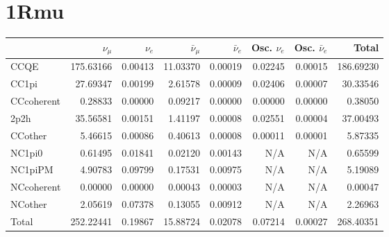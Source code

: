\documentclass[10pt,a4paper]{article}
\begin{document}
\section*{1Rmu}
\begin{tabular} { | l ||r | r | r | r | r | r | | r | }
\hline
              & $\nu_\mu$            & $\nu_e$              & $\bar{\nu}_{\mu}$    & $\bar{\nu}_{e}$      & Osc. $\nu_e$         & Osc. $\bar{\nu}_{e}$ & Total                \\ \hline\hline
 CCQE         & 175.63166            & 0.00413              & 11.03370             & 0.00019              & 0.02245              & 0.00015              & 186.69230            \\ \hline
 CC1pi        & 27.69347             & 0.00199              & 2.61578              & 0.00009              & 0.02406              & 0.00007              & 30.33546             \\ \hline
 CCcoherent   & 0.28833              & 0.00000              & 0.09217              & 0.00000              & 0.00000              & 0.00000              & 0.38050              \\ \hline
 2p2h         & 35.56581             & 0.00151              & 1.41197              & 0.00008              & 0.02551              & 0.00004              & 37.00493             \\ \hline
 CCother      & 5.46615              & 0.00086              & 0.40613              & 0.00008              & 0.00011              & 0.00001              & 5.87335              \\ \hline
 NC1pi0       & 0.61495              & 0.01841              & 0.02120              & 0.00143              & N/A                  & N/A                  & 0.65599              \\ \hline
 NC1piPM      & 4.90783              & 0.09799              & 0.17531              & 0.00975              & N/A                  & N/A                  & 5.19089              \\ \hline
 NCcoherent   & 0.00000              & 0.00000              & 0.00043              & 0.00003              & N/A                  & N/A                  & 0.00047              \\ \hline
 NCother      & 2.05619              & 0.07378              & 0.13055              & 0.00912              & N/A                  & N/A                  & 2.26963              \\ \hline
\hline
 Total        & 252.22441            & 0.19867              & 15.88724             & 0.02078              & 0.07214              & 0.00027              & 268.40351            \\ \hline

\end{tabular}
\end{document}
